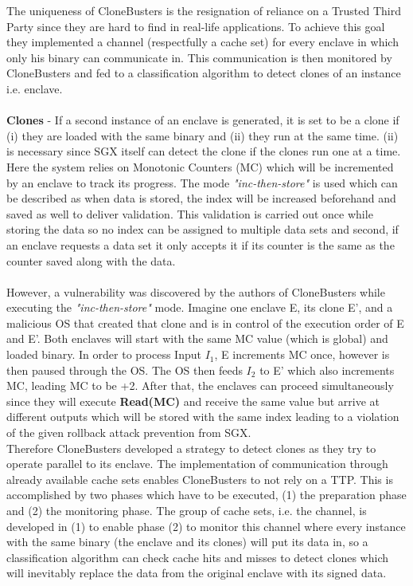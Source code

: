 The uniqueness of CloneBusters is the resignation of reliance on a Trusted Third Party since they are hard to find in real-life applications. To achieve this goal they implemented a channel (respectfully a cache set) for every enclave in which only his binary can communicate in. This communication is then monitored by CloneBusters and fed to a classification algorithm to detect clones of an instance i.e. enclave. \\
\\
\textbf{Clones} - If a second instance of an enclave is generated, it is set to be a clone if (i) they are loaded with the same binary and (ii) they run at the same time. (ii) is necessary since SGX itself can detect the clone if the clones run one at a time. Here the system relies on Monotonic Counters (MC) which will be incremented by an enclave to track its progress. The mode \textit{"inc-then-store"} is used which can be described as when data is stored, the index will be increased beforehand and saved as well to deliver validation. This validation is carried out once while storing the data so no index can be assigned to multiple data sets and second, if an enclave requests a data set it only accepts it if its counter is the same as the counter saved along with the data.
\\
\\
However, a vulnerability was discovered by the authors of CloneBusters while executing the \textit{"inc-then-store"} mode. Imagine one enclave E, its clone E', and a malicious OS that created that clone and is in control of the execution order of E and E'. Both enclaves will start with the same MC value (which is global) and loaded binary. In order to process Input \(I_1\), E increments MC once, however is then paused through the OS. The OS then feeds \(I_2\) to E' which also increments MC, leading MC to be +2. After that, the enclaves can proceed simultaneously since they will execute \textbf{Read(MC)} and receive the same value but arrive at different outputs which will be stored with the same index leading to a violation of the given rollback attack prevention from SGX. \\
Therefore CloneBusters developed a strategy to detect clones as they try to operate parallel to its enclave. The implementation of communication through already available cache sets enables CloneBusters to not rely on a TTP. This is accomplished by two phases which have to be executed, (1) the preparation phase and (2) the monitoring phase. The group of cache sets, i.e. the channel, is developed in (1) to enable phase (2) to monitor this channel where every instance with the same binary (the enclave and its clones) will put its data in, so a classification algorithm can check cache hits and misses to detect clones which will inevitably replace the data from the original enclave with its signed data.

